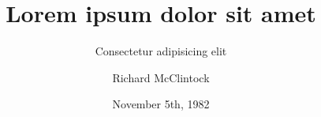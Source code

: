 

\title{Lorem ipsum dolor sit amet}
\subtitle{Consectetur adipisicing elit}


\author{Richard McClintock}
\date[05/11/1982]{November 5th, 1982}
